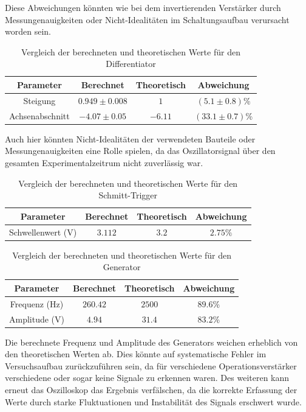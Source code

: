 \documentclass[12pt]{article}
\begin{document}
Diese Abweichungen könnten wie bei dem invertierenden Verstärker durch Messungenauigkeiten oder Nicht-Idealitäten im Schaltungsaufbau verursacht worden sein.

\begin{table}[H]
  \centering
  \caption{Vergleich der berechneten und theoretischen Werte für den Differentiator}
  \begin{tabular}{c | c c | c}
  \toprule
  Parameter & Berechnet & Theoretisch & Abweichung \\
  \midrule
  Steigung & $0.949 \pm 0.008$ & $1$ & $(5.1\pm0.8)$\%\\
  Achsenabschnitt & $-4.07 \pm 0.05$ & $-6.11$ & $(33.1\pm0.7)$\%\\
  \bottomrule
  \end{tabular}
  \label{tab:differentiator}
\end{table}

Auch hier könnten Nicht-Idealitäten der verwendeten Bauteile oder Messungenauigkeiten eine Rolle spielen, da das Oszillatorsignal über den gesamten Experimentalzeitrum nicht zuverlässig war.

\begin{table}[H]
  \centering
  \caption{Vergleich der berechneten und theoretischen Werte für den Schmitt-Trigger}
  \begin{tabular}{c | c c | c}
  \toprule
  Parameter & Berechnet & Theoretisch & Abweichung \\
  \midrule
  Schwellenwert (V) & $3.112$ & $3.2$ & $2.75\%$\\
  \bottomrule
  \end{tabular}
  \label{tab:schmitt_trigger}
\end{table}

\begin{table}[H]
  \centering
  \caption{Vergleich der berechneten und theoretischen Werte für den Generator}
  \begin{tabular}{c | c c | c}
  \toprule
  Parameter & Berechnet & Theoretisch & Abweichung \\
  \midrule
  Frequenz (Hz) & $260.42$ & $2500$ & $89.6$\%\\
  Amplitude (V) & $4.94$ & $31.4$ & $83.2$\%\\
  \bottomrule
  \end{tabular}
  \label{tab:generator}
\end{table}

Die berechnete Frequenz und Amplitude des Generators weichen erheblich von den theoretischen Werten ab. Dies könnte auf systematische Fehler im Versuchsaufbau zurückzuführen sein, da für verschiedene Operationsverstärker verschiedene oder sogar keine Signale zu erkennen waren. Des weiteren kann erneut das Oszilloskop das Ergebnis verfälschen, da die korrekte Erfassung der Werte durch starke Fluktuationen und Instabilität des Signals erschwert wurde.
\end{document}
